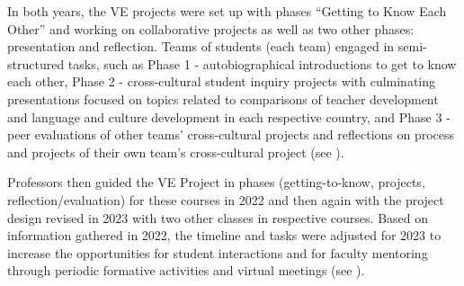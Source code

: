 In both years, the VE projects were set up with phases \enquote{Getting to Know
Each Other} and working on collaborative projects as well as two other
phases: presentation and reflection. Teams of students (each team)
engaged in semi-structured tasks, such as Phase 1 - autobiographical
introductions to get to know each other, Phase 2 - cross-cultural
student inquiry projects with culminating presentations focused on
topics related to comparisons of teacher development and language and
culture development in each respective country, and Phase 3 - peer
evaluations of other teams' cross-cultural projects and reflections on
process and projects of their own team's cross-cultural project (see ).
		
Professors then guided the VE Project in phases (getting-to-know,
projects, reflection/evaluation) for these courses in 2022 and then
again with the project design revised in 2023 with two other classes in
respective courses. Based on information gathered in 2022, the timeline
and tasks were adjusted for 2023 to increase the opportunities for
student interactions and for faculty mentoring through periodic
formative activities and virtual meetings (see ).

